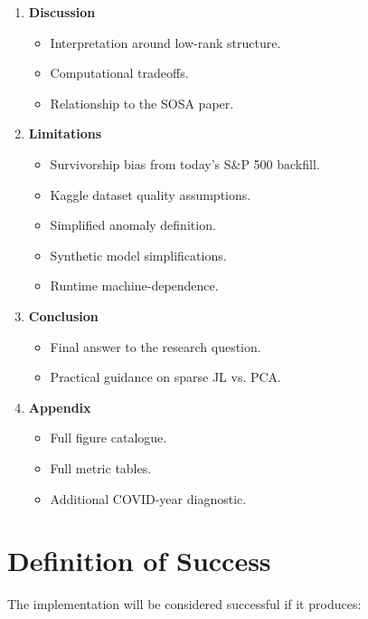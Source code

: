 \documentclass[11pt]{article}
\begin{document}
\begin{enumerate}
    \item \textbf{Discussion}
    \begin{itemize}
        \item Interpretation around low-rank structure.
        \item Computational tradeoffs.
        \item Relationship to the SOSA paper.
    \end{itemize}

    \item \textbf{Limitations}
    \begin{itemize}
        \item Survivorship bias from today's S\&P 500 backfill.
        \item Kaggle dataset quality assumptions.
        \item Simplified anomaly definition.
        \item Synthetic model simplifications.
        \item Runtime machine-dependence.
    \end{itemize}

    \item \textbf{Conclusion}
    \begin{itemize}
        \item Final answer to the research question.
        \item Practical guidance on sparse JL vs. PCA.
    \end{itemize}

    \item \textbf{Appendix}
    \begin{itemize}
        \item Full figure catalogue.
        \item Full metric tables.
        \item Additional COVID-year diagnostic.
    \end{itemize}
\end{enumerate}

\section{Definition of Success}

The implementation will be considered successful if it produces:
\end{document}
